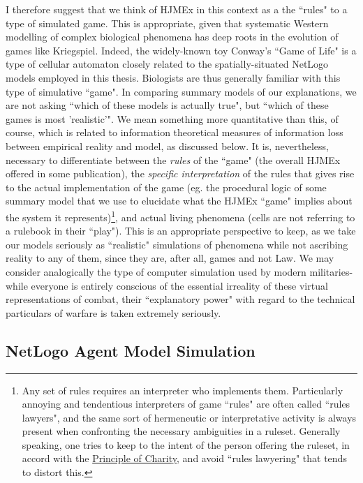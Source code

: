  I therefore suggest that we think of HJMEx in this context as a the ``rules" to a type of simulated game. This is appropriate, given that systematic Western modelling of complex biological phenomena has deep roots in the evolution of games like Kriegspiel. Indeed, the widely-known toy Conway's ``Game of Life" is a type of cellular automaton closely related to the spatially-situated NetLogo models employed in this thesis. Biologists are thus generally familiar with this type of simulative ``game". In comparing summary models of our explanations, we are not asking ``which of these models is actually true", but ``which of these games is most 'realistic'". We mean something more quantitative than this, of course, which is related to information theoretical measures of information loss between empirical reality and model, as discussed below. It is, nevertheless, necessary to differentiate between the \textit{rules} of the ``game" (the overall HJMEx offered in some publication), the \textit{specific interpretation} of the rules that gives rise to the actual implementation of the game (eg. the procedural logic of some summary model that we use to elucidate what the HJMEx ``game" implies about the system it represents)\footnote{Any set of rules requires an interpreter who implements them. Particularly annoying and tendentious interpreters of game ``rules" are often called ``rules lawyers", and the same sort of hermeneutic or interpretative activity is always present when confronting the necessary ambiguities in a ruleset. Generally speaking, one tries to keep to the intent of the person offering the ruleset, in accord with the \hyperref[charity]{Principle of Charity}, and avoid ``rules lawyering" that tends to distort this.}, and actual living phenomena (cells are not referring to a rulebook in their ``play"). This is an appropriate perspective to keep, as we take our models seriously as ``realistic" simulations of phenomena while not ascribing reality to any of them, since they are, after all, games and not Law. We may consider analogically the type of computer simulation used by modern militaries- while everyone is entirely conscious of the essential irreality of these virtual representations of combat, their ``explanatory power" with regard to the technical particulars of warfare is taken extremely seriously. 

\subsection{NetLogo Agent Model Simulation}

